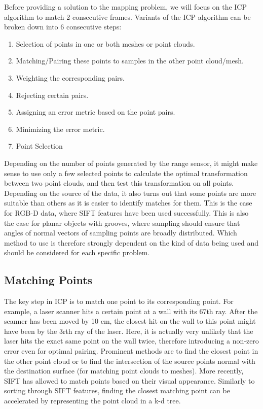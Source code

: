 \documentclass[paper=6.14in:9.21in,pagesize=pdftex,11pt,twoside,openright]{scrbook}
\begin{document}
Before providing a solution to the mapping problem, we will focus on the ICP algorithm to match 2 consecutive frames. Variants of the ICP algorithm can be broken down into 6 consecutive steps:
\begin{enumerate}
\item Selection of points in one or both meshes or point clouds.
\item Matching/Pairing these points to samples in the other point cloud/mesh.
\item Weighting the corresponding pairs.
\item Rejecting certain pairs.
\item Assigning an error metric based on the point pairs.
\item Minimizing the error metric.
\item Point Selection
\end{enumerate}
Depending on the number of points generated by the range sensor, it might make sense to use only a few selected points to calculate the optimal transformation between two point clouds, and then test this transformation on all points. Depending on the source of the data, it also turns out that some points are more suitable than others as it is easier to identify matches for them. This is the case for RGB-D data, where SIFT features have been used successfully. This is also the case for planar objects with grooves, where sampling should ensure that angles of normal vectors of sampling points are broadly distributed. Which method to use is therefore strongly dependent on the kind of data being used and should be considered for each specific problem.

\subsection{Matching Points}
The key step in ICP is to match one point to its corresponding point.  For example, a laser scanner hits a certain point at a wall with its 67th ray. After the scanner has been moved by 10 cm, the closest hit on the wall to this point might have been by the 3rth ray of the laser. Here, it is actually very unlikely that the laser hits the exact same point on the wall twice, therefore introducing a non-zero error even for optimal pairing. Prominent methods are to find the closest point in the other point cloud or to find the intersection of the source points normal with the destination surface (for matching point clouds to meshes). More recently, SIFT has allowed to match points based on their visual appearance. Similarly to sorting through SIFT features, finding the closest matching point can be accelerated by representing the point cloud in a k-d tree.
\end{document}
